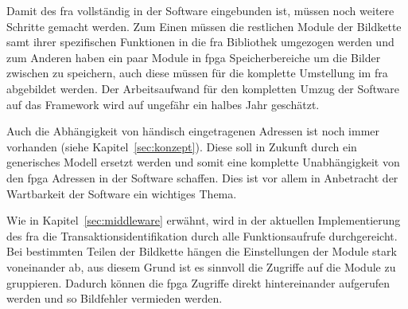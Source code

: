 
Damit des \ac{fra} vollständig in der Software eingebunden ist, müssen noch weitere Schritte gemacht werden. Zum Einen müssen die restlichen Module der Bildkette samt ihrer spezifischen Funktionen in die \ac{fra} Bibliothek umgezogen werden und zum Anderen haben ein paar Module in \ac{fpga} Speicherbereiche um die Bilder zwischen zu speichern, auch diese müssen für die komplette Umstellung im \ac{fra} abgebildet werden. Der Arbeitsaufwand für den kompletten Umzug der Software auf das Framework wird auf ungefähr ein halbes Jahr geschätzt.

Auch die Abhängigkeit von händisch eingetragenen Adressen ist noch immer vorhanden (siehe Kapitel~\ref{sec:konzept}). Diese soll in Zukunft durch ein generisches Modell ersetzt werden und somit eine komplette Unabhängigkeit von den \ac{fpga} Adressen in der Software schaffen. Dies ist vor allem in Anbetracht der Wartbarkeit der Software ein wichtiges Thema.

Wie in Kapitel~\ref{sec:middleware} erwähnt, wird in der aktuellen Implementierung des \ac{fra} die Transaktionsidentifikation durch alle Funktionsaufrufe durchgereicht. Bei bestimmten Teilen der Bildkette hängen die Einstellungen der Module stark voneinander ab, aus diesem Grund ist es sinnvoll die Zugriffe auf die Module zu gruppieren. Dadurch können die \ac{fpga} Zugriffe direkt hintereinander aufgerufen werden und so Bildfehler vermieden werden.




















